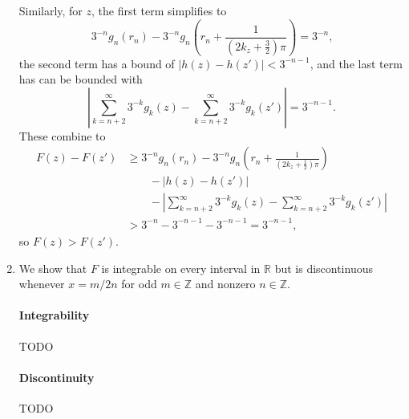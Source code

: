\documentclass[oneside]{article}
\newcommand\abs[1]{\left|#1\right|}
\newcommand\bbR{\mathbb{R}}
\newcommand\bbZ{\mathbb{Z}}
\begin{document}
\begin{enumerate}[label=(\alph*)]
      Similarly, for $z$, the first term simplifies to\[
        3^{-n}g_n(r_n) - 3^{-n}g_n\left(r_n + \frac1{\left(2k_z + \frac32\right)\pi}\right)
        = 3^{-n} \text{,}
      \] the second term has a bound of $\abs{h(z) - h(z')} < 3^{-n-1}$, and the last term has can be bounded with \[
        \abs{\sum_{k=n+2}^\infty 3^{-k} g_k(z) - \sum_{k=n+2}^\infty 3^{-k} g_k(z')} = 3^{-n-1} \text{.}
      \] These combine to\begin{align*}
        F(z) - F(z')
        &\geq 3^{-n}g_n(r_n) - 3^{-n}g_n\left(r_n + \frac1{\left(2k_z + \frac12\right)\pi}\right) \\
        &\qquad - \abs{h(z) - h(z')} \\
        &\qquad - \abs{\sum_{k=n+2}^\infty 3^{-k} g_k(z) - \sum_{k=n+2}^\infty 3^{-k} g_k(z')} \\
        &> 3^{-n} - 3^{-n-1} - 3^{-n-1} = 3^{-n-1} \text{,}
      \end{align*} so $F(z) > F(z')$.

    \item We show that $F$ is integrable on every interval in $\bbR$ but is discontinuous whenever $x = m/2n$ for odd $m \in \bbZ$ and nonzero $n \in \bbZ$.

    \paragraph{Integrability} TODO

    \paragraph{Discontinuity} TODO
  \end{enumerate}
\end{document}
